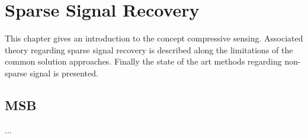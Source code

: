 \chapter{Sparse Signal Recovery}
This chapter gives an introduction to the concept compressive sensing. Associated theory regarding sparse signal recovery is described along the limitations of the common solution approaches. Finally the state of the art methods regarding non-sparse signal is presented. 
    




\section{MSB}\label{sec:M-SBL}
...
%